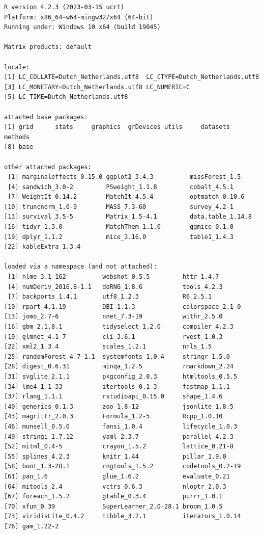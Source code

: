 \documentclass[
  letterpaper,
  DIV=11,
  numbers=noendperiod]{scrreprt}
\begin{document}
\begin{verbatim}
R version 4.2.3 (2023-03-15 ucrt)
Platform: x86_64-w64-mingw32/x64 (64-bit)
Running under: Windows 10 x64 (build 19045)

Matrix products: default

locale:
[1] LC_COLLATE=Dutch_Netherlands.utf8  LC_CTYPE=Dutch_Netherlands.utf8   
[3] LC_MONETARY=Dutch_Netherlands.utf8 LC_NUMERIC=C                      
[5] LC_TIME=Dutch_Netherlands.utf8    

attached base packages:
[1] grid      stats     graphics  grDevices utils     datasets  methods  
[8] base     

other attached packages:
 [1] marginaleffects_0.15.0 ggplot2_3.4.3          missForest_1.5        
 [4] sandwich_3.0-2         PSweight_1.1.8         cobalt_4.5.1          
 [7] WeightIt_0.14.2        MatchIt_4.5.4          optmatch_0.10.6       
[10] truncnorm_1.0-9        MASS_7.3-60            survey_4.2-1          
[13] survival_3.5-5         Matrix_1.5-4.1         data.table_1.14.8     
[16] tidyr_1.3.0            MatchThem_1.1.0        ggmice_0.1.0          
[19] dplyr_1.1.2            mice_3.16.0            table1_1.4.3          
[22] kableExtra_1.3.4      

loaded via a namespace (and not attached):
 [1] nlme_3.1-162          webshot_0.5.5         httr_1.4.7           
 [4] numDeriv_2016.8-1.1   doRNG_1.8.6           tools_4.2.3          
 [7] backports_1.4.1       utf8_1.2.3            R6_2.5.1             
[10] rpart_4.1.19          DBI_1.1.3             colorspace_2.1-0     
[13] jomo_2.7-6            nnet_7.3-19           withr_2.5.0          
[16] gbm_2.1.8.1           tidyselect_1.2.0      compiler_4.2.3       
[19] glmnet_4.1-7          cli_3.6.1             rvest_1.0.3          
[22] xml2_1.3.4            scales_1.2.1          nnls_1.5             
[25] randomForest_4.7-1.1  systemfonts_1.0.4     stringr_1.5.0        
[28] digest_0.6.31         minqa_1.2.5           rmarkdown_2.24       
[31] svglite_2.1.1         pkgconfig_2.0.3       htmltools_0.5.5      
[34] lme4_1.1-33           itertools_0.1-3       fastmap_1.1.1        
[37] rlang_1.1.1           rstudioapi_0.15.0     shape_1.4.6          
[40] generics_0.1.3        zoo_1.8-12            jsonlite_1.8.5       
[43] magrittr_2.0.3        Formula_1.2-5         Rcpp_1.0.10          
[46] munsell_0.5.0         fansi_1.0.4           lifecycle_1.0.3      
[49] stringi_1.7.12        yaml_2.3.7            parallel_4.2.3       
[52] mitml_0.4-5           crayon_1.5.2          lattice_0.21-8       
[55] splines_4.2.3         knitr_1.44            pillar_1.9.0         
[58] boot_1.3-28.1         rngtools_1.5.2        codetools_0.2-19     
[61] pan_1.6               glue_1.6.2            evaluate_0.21        
[64] mitools_2.4           vctrs_0.6.3           nloptr_2.0.3         
[67] foreach_1.5.2         gtable_0.3.4          purrr_1.0.1          
[70] xfun_0.39             SuperLearner_2.0-28.1 broom_1.0.5          
[73] viridisLite_0.4.2     tibble_3.2.1          iterators_1.0.14     
[76] gam_1.22-2           
\end{verbatim}
\end{document}
